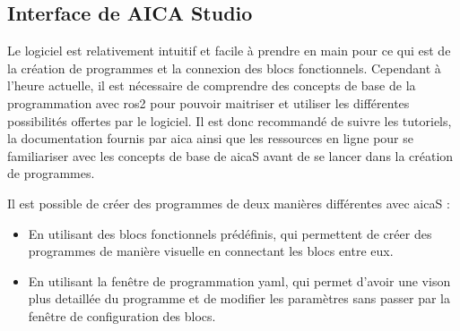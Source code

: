 \subsection{Interface de AICA Studio}
Le logiciel est relativement intuitif et facile à prendre en main pour ce qui est de la création de programmes et la connexion des blocs fonctionnels. Cependant à l'heure actuelle, il est nécessaire de comprendre des concepts de base de la programmation avec \gls{ros2} pour pouvoir maitriser et utiliser les différentes possibilités offertes par le logiciel. Il est donc recommandé de suivre les tutoriels, la documentation fournis par \gls{aica} ainsi que les ressources en ligne pour se familiariser avec les concepts de base de \gls{aicaS} avant de se lancer dans la création de programmes.

Il est possible de créer des programmes de deux manières différentes avec \gls{aicaS} :
\begin{itemize}
    \item En utilisant des blocs fonctionnels prédéfinis, qui permettent de créer des programmes de manière visuelle en connectant les blocs entre eux.
    \item En utilisant la fenêtre de programmation \gls{yaml}, qui permet d'avoir une vison plus detaillée du programme et de modifier les paramètres sans passer par la fenêtre de configuration des blocs.
\end{itemize}

